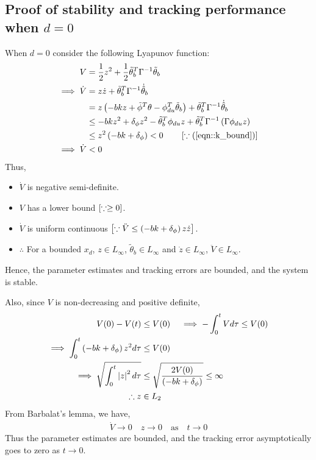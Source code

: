 \subsection{Proof of stability and tracking performance when $d = 0$}
When $d = 0$ consider the following Lyapunov function:
\begin{align*}
    V &= \frac{1}{2} z^2 + \frac{1}{2} \tilde{\theta}_b^T \Gamma^{-1} \tilde{\theta}_b\\
    \implies \dot V &= z \dot z + \tilde \theta_b^T \Gamma^{-1} \dot{\hat \theta}_b\\
    &= z \left( - bk z +  \tilde \phi^T \theta - \phi_{du}^T \tilde \theta_b \right)+ \tilde \theta_b^T \Gamma^{-1} \dot{\hat \theta}_b\\
    &\leq -bkz^2 + \delta_\phi z^2 - \tilde \theta_b^T \phi_{du} z + \tilde \theta_b^T \Gamma^{-1} \left( \Gamma \phi_{du} z \right)\\
    &\leq z^2 \left( -bk + \delta_\phi \right) < 0 \qquad \left[ \because (\ref{eqn::k_bound}) \right]\\
    \implies \dot V &< 0
\end{align*}
Thus,
\begin{itemize}
    \item $\dot V$ is negative semi-definite.
    \item $V$ has a lower bound $ \left[ \because \geq 0 \right]$.
\item $\dot V$ is uniform continuous $\left[ \because \ddot V \leq \left( -bk +
\delta_\phi \right)z \dot z  \right]$.
    \item $\therefore$ For a bounded $x_d$, $z \in L_\infty$, $\tilde{
    \theta}_b \in L_{\infty}$ and $\dot z \in L_\infty$, $\ddot V \in L_\infty$.
\end{itemize}

Hence, the parameter estimates and tracking errors are bounded, and the system
is stable.

Also, since $V$ is non-decreasing and positive definite,
\begin{align*}
    V(0) - V(t) &\leq V(0) \quad
    \implies -\int_0^t V d \tau \leq V(0)\\
    \implies \int_0^t \left( -bk + \delta_\phi \right) z^2 d \tau &\leq V(0)\\
    \implies \sqrt{\int_0^t \left\lvert z \right\rvert^2 d \tau } &\leq \sqrt{\frac{2 V(0)}{\left( -bk + \delta_\phi \right)}} \leq \infty\\
    \therefore z &\in L_2
\end{align*}
From Barbalat's lemma, we have,
\begin{align*}
    \dot V \rightarrow 0 \quad z \rightarrow 0 \quad \text{as} \quad t \rightarrow 0
\end{align*}
Thus the parameter estimates are bounded, and the tracking error asymptotically
goes to zero as  $t \rightarrow 0$.
